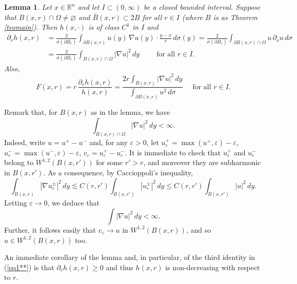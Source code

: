 \documentclass[11pt]{amsart}
\newcommand{\R}{{\mathbb R}}       %
\newcommand{\rf}[1]{{(\ref{#1})}}
\newcommand{\ve}{{\varepsilon}}
\newtheorem{lemma}[theorem]{Lemma}
\theoremstyle{definition}
\theoremstyle{remark}
\numberwithin{equation}{section}
\begin{document}
\begin{lemma}\label{lem-hxr}
Let $x\in\R^n$ and let $I\subset (0,\infty)$ be a closed bounded interval. Suppose that $B(x,r)\cap\Omega\neq\varnothing$ and $\bar B(x,r)\subset 2B$ for all $r\in I$ (where $B$ is as
Theorem \ref{teomain}). Then
$h(x,\cdot)$ is of class $C^1$ in $I$ and 
\begin{align}\label{eq1**}
\partial_r h(x,r) &= \frac2{\sigma(\partial B_r)} \int_{\partial B(x,r)} u(y)\,\nabla u(y)\cdot \frac{y-x}r\,d\sigma(y)= \frac2{\sigma(\partial B_r)} \int_{\partial B(x,r)\cap \Omega} u\,\partial_\nu  u\,d\sigma\\
& =\frac2{\sigma(\partial B_r)} \int_{B(x,r)\cap \Omega} |\nabla u|^2\,dy\qquad \mbox{ for all $r
\in I.$}\nonumber
\end{align}
Also,
\begin{equation}\label{eq2**}
F(x,r) = r\,\frac{\partial_r h(x,r)}{h(x,r)} =\frac{2 r\int_{B(x,r)} |\nabla u|^2\,dy}
{\int_{\partial B(x,r)} u^2\,d\sigma} \quad \mbox{ for all $r
\in I.$}
\end{equation}
\end{lemma}

Remark that, for $B(x,r)$ as in the lemma, we have
$$\int_{B(x,r)\cap \Omega} |\nabla u|^2\,dy<\infty.$$
Indeed, write $u=u^+ - u^-$ and, for any $\ve>0$, let $u^+_\ve=\max(u^+,\ve)-\ve$,
$u^-_\ve=\max(u^-,\ve)-\ve$, $v_\ve=u_\ve^+-u_\ve^-$. It is immediate to check that $u^+_\ve$ and $u_\ve^-$ belong to $W^{1,2}(B(x,r'))$ for some $r'>r$, and moreover they are subharmonic in
$B(x,r')$. As a consequence,
 by Caccioppoli's inequality,
$$\int_{B(x,r)} |\nabla u^\pm_\ve|^2\,dy \lesssim C(r,r')\int_{B(x,r')} |u^\pm_\ve|^2\,dy\leq C(r,r')\int_{B(x,r')} |u|^2\,dy.$$
Letting $\ve\to0$, we deduce that 
$$\int |\nabla u|^2\,dy<\infty.$$ 
Further, it follows easily that $v_\ve\to u$ in $W^{1,2}(B(x,r))$, and so $u\in W^{1,2}(B(x,r))$ too.

An immediate corollary of the lemma and, in particular, of the third identity in \rf{eq1**} is that $\partial_r h(x,r)\geq0$ and thus $h(x,r)$ is non-decreasing with respect to $r$. 
\end{document}
